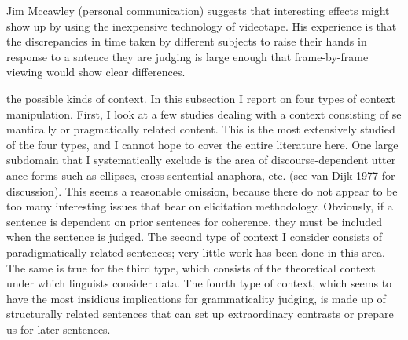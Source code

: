 \setcounter{listWWNumxxxiileveli}{5}
\begin{listWWNumxxxiileveli}
\item 
\begin{styleStandard}
Jim Mccawley (personal communication) suggests that interesting effects might show up by using the inexpensive technology of videotape. His experience is that the discrepancies in time taken by different subjects to raise their hands in response to a sntence they are judging is large enough that frame-by-frame viewing would show clear differences.
\end{styleStandard}


\end{listWWNumxxxiileveli}
\clearpage\setcounter{page}{1}\begin{styleTextbody}
the possible kinds of context. In this subsection I report on four types of context manipulation. First, I look at a few studies dealing with a context consisting of se\- mantically or pragmatically related content. This is the most extensively studied of the four types, and I cannot hope to cover the entire literature here. One large subdomain that I systematically exclude is the area of discourse-dependent utter\- ance forms such as ellipses, cross-sentential anaphora, etc. (see van Dijk 1977 for discussion). This seems a reasonable omission, because there do not appear to be too many interesting issues that bear on elicitation methodology. Obviously, if a sentence is dependent on prior sentences for coherence, they must be included when the sentence is judged. The second type of context I consider consists of paradigmatically related sentences; very little work has been done in this area. The same is true for the third type, which consists of the theoretical context under which linguists consider data. The fourth type of context, which seems to have the most insidious implications for grammaticality judging, is made up of structurally related sentences that can set up extraordinary contrasts or prepare us for later sentences.
\end{styleTextbody}


